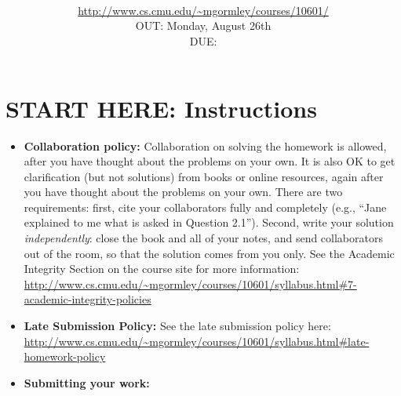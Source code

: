 \documentclass[11pt,addpoints,answers]{exam}
\title{\textsc{\hwName}
} %
\author{\courseName\\
\url{http://www.cs.cmu.edu/~mgormley/courses/10601/} \\
OUT: Monday, August 26th \\
DUE: \dueDate{} \\ 
}
\date{}
\date{}
\begin{document}
\maketitle

\section*{START HERE: Instructions}
\begin{itemize}
\item \textbf{Collaboration policy:} Collaboration on solving the homework is allowed, after you have thought about the problems on your own. It is also OK to get clarification (but not solutions) from books or online resources, again after you have thought about the problems on your own. There are two requirements: first, cite your collaborators fully and completely (e.g., ``Jane explained to me what is asked in Question 2.1''). Second, write your solution {\em independently}: close the book and all of your notes, and send collaborators out of the room, so that the solution comes from you only.  See the Academic Integrity Section on the course site for more information: \url{http://www.cs.cmu.edu/~mgormley/courses/10601/syllabus.html#7-academic-integrity-policies}

\item\textbf{Late Submission Policy:} See the late submission policy here: \url{http://www.cs.cmu.edu/~mgormley/courses/10601/syllabus.html#late-homework-policy}

\item\textbf{Submitting your work:} 

\begin{itemize}



\end{itemize}
\end{itemize}
\end{document}
